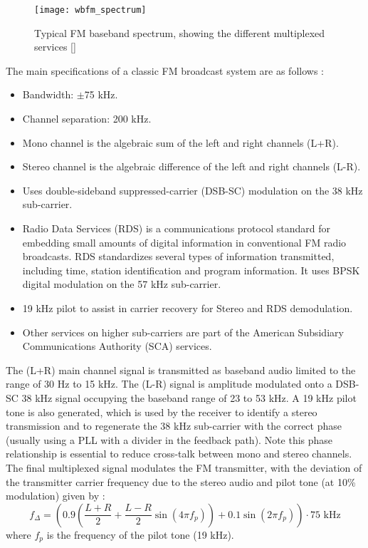 \begin{figure}[H]
  \centering
  \texttt{[image: wbfm\_spectrum]}
  \caption{Typical FM baseband spectrum, showing the different multiplexed services [\citeauthor{image:fm_spectrum}]}
  \label{fig:wbfm_spectrum}
\end{figure}

The main specifications of a classic FM broadcast system are as follows \cite{fm_demod2}:
\begin{itemize}
  \item Bandwidth: $\pm$75 kHz.
  \item Channel separation: 200 kHz.
  \item Mono channel is the algebraic sum of the left and right channels (L+R).
  \item Stereo channel is the algebraic difference of the left and right channels (L-R).
  \item Uses double-sideband suppressed-carrier (DSB-SC) modulation on the 38 kHz sub-carrier.
  \item Radio Data Services (RDS) is a communications protocol standard for embedding small amounts of digital information in conventional FM radio broadcasts. RDS standardizes several types of information transmitted, including time, station identification and program information. It uses BPSK digital modulation on the 57 kHz sub-carrier.
  \item 19 kHz pilot to assist in carrier recovery for Stereo and RDS demodulation.
  \item Other services on higher sub-carriers are part of the American Subsidiary Communications Authority (SCA) services.
\end{itemize}

The (L+R) main channel signal is transmitted as baseband audio limited to the range of 30 Hz to 15 kHz. The (L-R) signal is amplitude modulated onto a DSB-SC 38 kHz signal occupying the baseband range of 23 to 53 kHz. A 19 kHz pilot tone is also generated, which is used by the receiver to identify a stereo transmission and to regenerate the 38 kHz sub-carrier with the correct phase (usually using a PLL with a divider in the feedback path). Note this phase relationship is essential to reduce cross-talk between mono and stereo channels. The final multiplexed signal modulates the FM transmitter, with the deviation of the transmitter carrier frequency due to the stereo audio and pilot tone (at 10\% modulation) given by \cite{fm_demod}:
\begin{equation} \label{eq:fm_signal_freq}
  f_\Delta = \left(0.9\left(\frac{L+R}{2}+\frac{L-R}{2}\sin(4\pi f_p)\right)+0.1\sin(2\pi f_p)\right)\cdot 75 \text{ kHz}
\end{equation}
where $f_p$ is the frequency of the pilot tone (19 kHz).

